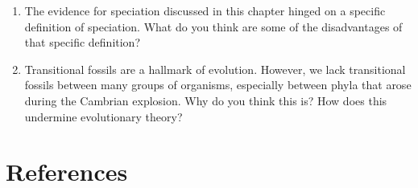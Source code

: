 \documentclass[
]{book}
\providecommand{\tightlist}{%
  \setlength{\itemsep}{0pt}\setlength{\parskip}{0pt}}
\begin{document}
\begin{enumerate}
\def\labelenumi{\arabic{enumi}.}
\setcounter{enumi}{1}
\tightlist
\item
  The evidence for speciation discussed in this chapter hinged on a specific definition of speciation. What do you think are some of the disadvantages of that specific definition?
\item
  Transitional fossils are a hallmark of evolution. However, we lack transitional fossils between many groups of organisms, especially between phyla that arose during the Cambrian explosion. Why do you think this is? How does this undermine evolutionary theory?
\end{enumerate}

\hypertarget{references-2}{%
\section{References}\label{references-2}}
\end{document}

